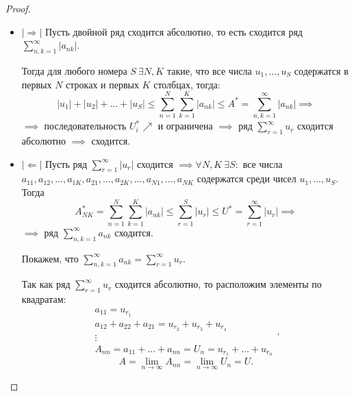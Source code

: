 \begin{proof}\leavevmode
    \begin{itemize}
        \item $ |\Rightarrow| $ Пусть двойной ряд сходится абсолютно, то есть сходится ряд $\sum_{n,k=1}^{\infty}|a_{nk}|$.

              Тогда для любого номера $S \ \exists N,K$ такие, что все числа $u_1,\ldots,u_S$ содержатся в первых $N$ строках и первых $K$ столбцах, тогда:
              \[
                |u_1| + |u_2| + \ldots + |u_S| \leqslant \sum_{n=1}^{N}\sum_{k=1}^{K}|a_{nk}| \leqslant A^* = \sum_{n,k=1}^{\infty}|a_{nk}| \implies
              \]
              $\implies$ последовательность $U_i^* \nearrow$ и ограничена $\implies$ ряд $\sum_{r=1}^{\infty}u_r$ сходится абсолютно $\implies$ сходится.

        \item $ |\Leftarrow| $ Пусть ряд $\sum_{r=1}^{\infty}|u_r|$ сходится $\implies \forall N,K \ \exists S:$ все числа $a_{11},a_{12},\ldots,a_{1K},a_{21},\ldots,a_{2K},\ldots,a_{N1},\ldots,a_{NK}$ содержатся среди чисел $u_1,\ldots,u_S$. Тогда
              \[
                A_{NK}^* = \sum_{n=1}^{N}\sum_{k=1}^{K}|a_{nk}| \leqslant\sum_{r=1}^{S}|u_r| \leqslant U^* = \sum_{r=1}^{\infty}|u_r| \implies
              \]
              $\implies$ ряд $\sum_{n,k=1}^{\infty}a_{nk}$ сходится.

              Покажем, что $\sum_{n,k=1}^{\infty}a_{nk} = \sum_{r=1}^{\infty}u_r$.

              Так как ряд $\sum_{r=1}^{\infty}u_r$ сходится абсолютно, то расположим элементы по квадратам:
              \[
                \begin{array}{l}
                    a_{11} = u_{r_1}                                       \\
                    a_{12} + a_{22} + a_{21} = u_{r_2} + u_{r_3} + u_{r_4} \\
                    \vdots                                                 \\
                    A_{nn} = a_{11} + \ldots + a_{nn} = U_n = u_{r_1} + \ldots + u_{r_n}
                \end{array},
              \]
              \[
                A = \underset{n\rightarrow\infty}{\lim}A_{nn} = \underset{n\rightarrow\infty}{\lim}U_n = U.
              \]
    \end{itemize}
\end{proof}